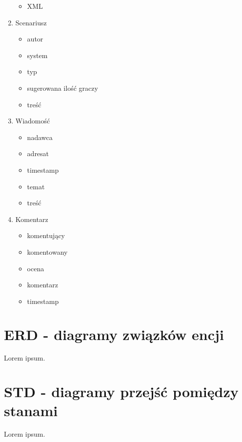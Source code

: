 \begin{enumerate}
\begin{itemize}
	\item XML
	\end{itemize}
\item Scenariusz
	\begin{itemize}
	\item autor
	\item system
	\item typ
	\item sugerowana ilość graczy
	\item treść
	\end{itemize}
\item Wiadomość
	\begin{itemize}
	\item nadawca
	\item adresat
	\item timestamp
	\item temat
	\item treść
	\end{itemize}
\item Komentarz
	\begin{itemize}
	\item komentujący
	\item komentowany
	\item ocena
	\item komentarz
	\item timestamp
	\end{itemize}
\end{enumerate}


\section{ERD - diagramy związków encji}
\label{sec:ERD}

Lorem ipsum.


\section{STD - diagramy przejść pomiędzy stanami}
\label{sec:STD}

Lorem ipsum.